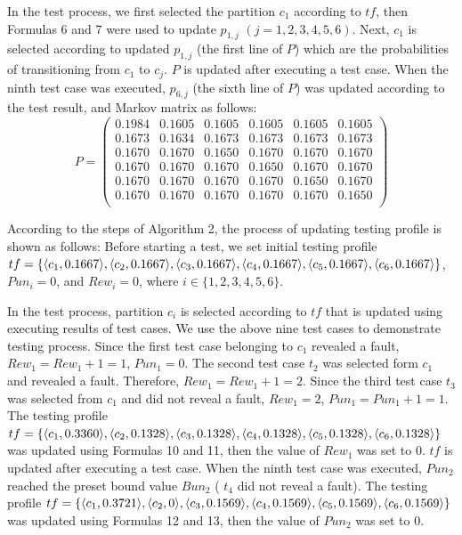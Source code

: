 \documentclass[10pt,journal,compsoc]{IEEEtran}
\begin{document}
In the test process, we first selected the partition $c_1$ according to $tf$, then Formulas 6 and 7 were used to update $p_{1,j}$ $(j = 1,2,3,4,5,6)$. Next, $c_1$ is selected according to updated $p_{1,j}$ (the first line of $P$) which are the probabilities of transitioning from $c_1$ to $c_j$. $P$ is updated after executing a test case. When the ninth test case was executed, $p_{6,j}$ (the sixth line of $P$) was updated according to the test result, and Markov matrix as follows:
\begin{equation}
\label{eq:sixthmatrix}
P =
\begin{pmatrix}
	0.1984 & 0.1605  & 0.1605  & 0.1605  & 0.1605  & 0.1605 \\
	0.1673 & 0.1634  & 0.1673  & 0.1673  & 0.1673  & 0.1673  \\
	0.1670 & 0.1670  & 0.1650  & 0.1670  & 0.1670  & 0.1670  \\
    0.1670 & 0.1670  & 0.1670  & 0.1650  & 0.1670  & 0.1670  \\
    0.1670 & 0.1670  & 0.1670  & 0.1670  & 0.1650  & 0.1670  \\
    0.1670 & 0.1670  & 0.1670  & 0.1670  & 0.1670  & 0.1650  \\
\end{pmatrix}
\end{equation}

According to the steps of Algorithm 2, the process of updating testing profile is shown as follows: Before starting a test, we set initial testing profile $tf = \{\langle c_1,0.1667 \rangle, \langle c_2, 0.1667\rangle, \langle c_3, 0.1667 \rangle, \langle c_4, 0.1667 \rangle, \langle c_5, 0.16\\67 \rangle, \langle c_6, 0.1667 \rangle\}$, $Pun_i = 0$, and $Rew_i = 0$, where $i \in \{1, 2, 3, 4, 5, 6\}$.

In the test process, partition $c_i$ is selected according to $tf$ that is updated using executing results of test cases. We use the above nine test cases to demonstrate testing process. Since the first test case belonging to $c_1$ revealed a fault, $Rew_1 = Rew_1 + 1 = 1$, $Pun_1 = 0$. The second test case $t_2$ was selected form $c_1$ and revealed a fault. Therefore, $Rew_1 = Rew_1 + 1 = 2$. Since the third test case $t_3$ was selected from $c_1$ and did not reveal a fault, $Rew_1 = 2$, $Pun_1 = Pun_1 + 1 = 1$. The testing profile $tf = \{\langle c_1,0.3360 \rangle, \langle c_2, 0.1328\rangle, \langle c_3, 0.1328 \rangle, \langle c_4, 0.1328 \rangle, \langle c_5, 0.13\\28 \rangle, \langle c_6, 0.1328 \rangle\}$ was updated using Formulas 10 and 11, then the value of $Rew_1$ was set to 0. $tf$ is updated after executing a test case. When the ninth test case was executed, $Pun_2$ reached the preset bound value $Bun_2$ ( $t_4$ did not reveal a fault). The testing profile $tf = \{\langle c_1,0.3721 \rangle, \langle c_2, 0\rangle, \langle c_3, 0.1569 \rangle, \langle c_4, 0.1569 \rangle, \langle c_5, 0.1569 \rangle, \\ \langle c_6, 0.1569 \rangle\}$ was updated using Formulas 12 and 13, then the value of $Pun_2$ was set to 0.
\end{document}
